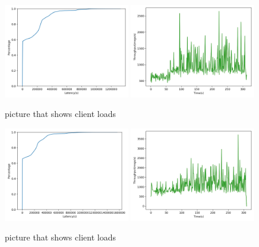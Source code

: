 \begin{figure}[!htb]
  \centering
  \includegraphics[width=0.49\textwidth,height=\textheight,keepaspectratio]{img/local10_lat.png}
  \includegraphics[width=0.49\textwidth,height=\textheight,keepaspectratio]{img/local10_tp.png}
  \caption[caption]{ picture that shows client loads }
  \label{fig:local10-performance}
\end{figure}

\begin{figure}[!htb]
  \centering
  \includegraphics[width=0.49\textwidth,height=\textheight,keepaspectratio]{img/local5_lat.png}
  \includegraphics[width=0.49\textwidth,height=\textheight,keepaspectratio]{img/local5_tp.png}
  \caption[caption]{ picture that shows client loads }
  \label{fig:local5-performance}
\end{figure}

